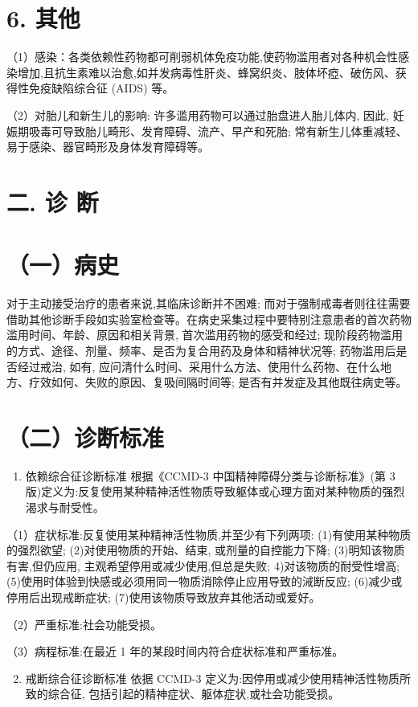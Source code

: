 \documentclass[10pt]{article}
\begin{document}
\section*{6. 其他}
（1）感染：各类依赖性药物都可削弱机体免疫功能,使药物滥用者对各种机会性感染增加,且抗生素难以治愈,如并发病毒性肝炎、蜂窝织炎、肢体坏瘂、破伤风、获得性免疫缺陷综合征 (AIDS) 等。

（2）对胎儿和新生儿的影响: 许多滥用药物可以通过胎盘进人胎儿体内, 因此, 妊娠期吸毒可导致胎儿畸形、发育障碍、流产、早产和死胎; 常有新生儿体重减轻、易于感染、器官畸形及身体发育障碍等。

\section*{二. 诊 断}
\section*{（一）病史}
对于主动接受治疗的患者来说,其临床诊断并不困难; 而对于强制戒毒者则往往需要借助其他诊断手段如实验室检查等。在病史采集过程中要特别注意患者的首次药物滥用时间、年龄、原因和相关背景, 首次滥用药物的感受和经过; 现阶段药物滥用的方式、途径、剂量、频率、是否为复合用药及身体和精神状况等; 药物滥用后是否经过戒治, 如有, 应问清什么时间、采用什么方法、使用什么药物、在什么地方、疗效如何、失败的原因、复吸间隔时间等; 是否有并发症及其他既往病史等。

\section*{（二）诊断标准}
\begin{enumerate}
  \item 依赖综合征诊断标准 根据《CCMD-3 中国精神障碍分类与诊断标准》(第 3 版)定义为:反复使用某种精神活性物质导致躯体或心理方面对某种物质的强烈渴求与耐受性。
\end{enumerate}

（1）症状标准:反复使用某种精神活性物质,并至少有下列两项: (1)有使用某种物质的强烈欲望; (2)对使用物质的开始、结束, 或剂量的自控能力下降; (3)明知该物质有害,但仍应用, 主观希望停用或减少使用,但总是失败; 4)对该物质的耐受性增高; (5)使用时体验到快感或必须用同一物质消除停止应用导致的㳦断反应; (6)减少或停用后出现戒断症状; (7)使用该物质导致放弃其他活动或爱好。

（2）严重标准:社会功能受损。

（3）病程标准:在最近 1 年的某段时间内符合症状标准和严重标准。

\begin{enumerate}
  \setcounter{enumi}{1}
  \item 戒断综合征诊断标准 依据 CCMD-3 定义为:因停用或减少使用精神活性物质所致的综合征, 包括引起的精神症状、躯体症状,或社会功能受损。
\end{enumerate}
\end{document}

